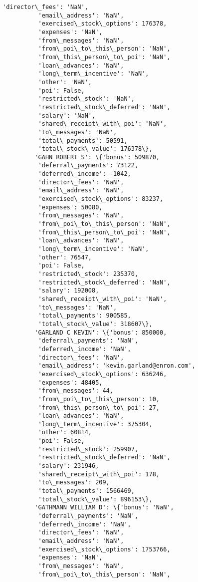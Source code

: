 \documentclass[11pt]{article}
\begin{document}
\begin{Verbatim}[commandchars=\\\{\}]
          'director\_fees': 'NaN',
          'email\_address': 'NaN',
          'exercised\_stock\_options': 176378,
          'expenses': 'NaN',
          'from\_messages': 'NaN',
          'from\_poi\_to\_this\_person': 'NaN',
          'from\_this\_person\_to\_poi': 'NaN',
          'loan\_advances': 'NaN',
          'long\_term\_incentive': 'NaN',
          'other': 'NaN',
          'poi': False,
          'restricted\_stock': 'NaN',
          'restricted\_stock\_deferred': 'NaN',
          'salary': 'NaN',
          'shared\_receipt\_with\_poi': 'NaN',
          'to\_messages': 'NaN',
          'total\_payments': 50591,
          'total\_stock\_value': 176378\},
         'GAHN ROBERT S': \{'bonus': 509870,
          'deferral\_payments': 73122,
          'deferred\_income': -1042,
          'director\_fees': 'NaN',
          'email\_address': 'NaN',
          'exercised\_stock\_options': 83237,
          'expenses': 50080,
          'from\_messages': 'NaN',
          'from\_poi\_to\_this\_person': 'NaN',
          'from\_this\_person\_to\_poi': 'NaN',
          'loan\_advances': 'NaN',
          'long\_term\_incentive': 'NaN',
          'other': 76547,
          'poi': False,
          'restricted\_stock': 235370,
          'restricted\_stock\_deferred': 'NaN',
          'salary': 192008,
          'shared\_receipt\_with\_poi': 'NaN',
          'to\_messages': 'NaN',
          'total\_payments': 900585,
          'total\_stock\_value': 318607\},
         'GARLAND C KEVIN': \{'bonus': 850000,
          'deferral\_payments': 'NaN',
          'deferred\_income': 'NaN',
          'director\_fees': 'NaN',
          'email\_address': 'kevin.garland@enron.com',
          'exercised\_stock\_options': 636246,
          'expenses': 48405,
          'from\_messages': 44,
          'from\_poi\_to\_this\_person': 10,
          'from\_this\_person\_to\_poi': 27,
          'loan\_advances': 'NaN',
          'long\_term\_incentive': 375304,
          'other': 60814,
          'poi': False,
          'restricted\_stock': 259907,
          'restricted\_stock\_deferred': 'NaN',
          'salary': 231946,
          'shared\_receipt\_with\_poi': 178,
          'to\_messages': 209,
          'total\_payments': 1566469,
          'total\_stock\_value': 896153\},
         'GATHMANN WILLIAM D': \{'bonus': 'NaN',
          'deferral\_payments': 'NaN',
          'deferred\_income': 'NaN',
          'director\_fees': 'NaN',
          'email\_address': 'NaN',
          'exercised\_stock\_options': 1753766,
          'expenses': 'NaN',
          'from\_messages': 'NaN',
          'from\_poi\_to\_this\_person': 'NaN',

\end{Verbatim}
\end{document}
